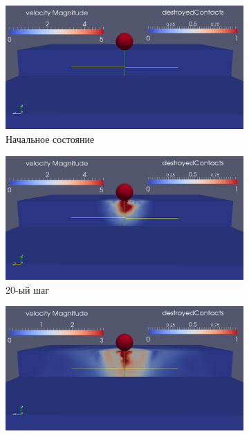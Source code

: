 \begin{figure}[H]
\begin{subfigure}[b]{0.5\textwidth}
\centering
\includegraphics[width=1.0\textwidth]{png/delamination/single_clip/0.png}
\caption{Начальное состояние}
\end{subfigure}
\begin{subfigure}[b]{0.5\textwidth}
\centering
\includegraphics[width=1.0\textwidth]{png/delamination/single_clip/20.png}
\caption{20-ый шаг}
\end{subfigure}
\begin{subfigure}[b]{0.5\textwidth}
\centering
\includegraphics[width=1.0\textwidth]{png/delamination/single_clip/70.png}

\end{subfigure}
\end{figure}
